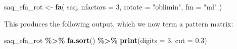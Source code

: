 \documentclass[
]{book}
\newenvironment{Shaded}{\begin{snugshade}}{\end{snugshade}}
\newcommand{\AttributeTok}[1]{\textcolor[rgb]{0.13,0.29,0.53}{#1}}
\newcommand{\DecValTok}[1]{\textcolor[rgb]{0.00,0.00,0.81}{#1}}
\newcommand{\FloatTok}[1]{\textcolor[rgb]{0.00,0.00,0.81}{#1}}
\newcommand{\FunctionTok}[1]{\textcolor[rgb]{0.13,0.29,0.53}{\textbf{#1}}}
\newcommand{\NormalTok}[1]{#1}
\newcommand{\OtherTok}[1]{\textcolor[rgb]{0.56,0.35,0.01}{#1}}
\newcommand{\SpecialCharTok}[1]{\textcolor[rgb]{0.81,0.36,0.00}{\textbf{#1}}}
\newcommand{\StringTok}[1]{\textcolor[rgb]{0.31,0.60,0.02}{#1}}
\begin{document}
\begin{Shaded}
\begin{Highlighting}[]
\NormalTok{saq\_efa\_rot }\OtherTok{\textless{}{-}} \FunctionTok{fa}\NormalTok{(}
\NormalTok{  saq,}
  \AttributeTok{nfactors =} \DecValTok{3}\NormalTok{,}
  \AttributeTok{rotate =} \StringTok{"oblimin"}\NormalTok{,}
  \AttributeTok{fm =} \StringTok{"ml"}
\NormalTok{)}
\end{Highlighting}
\end{Shaded}

This produces the following output, which we now term a pattern matrix:

\begin{Shaded}
\begin{Highlighting}[]
\NormalTok{saq\_efa\_rot }\SpecialCharTok{\%\textgreater{}\%}
  \FunctionTok{fa.sort}\NormalTok{() }\SpecialCharTok{\%\textgreater{}\%}
  \FunctionTok{print}\NormalTok{(}\AttributeTok{digits =} \DecValTok{3}\NormalTok{, }\AttributeTok{cut =} \FloatTok{0.3}\NormalTok{)}
\end{Highlighting}
\end{Shaded}
\end{document}
